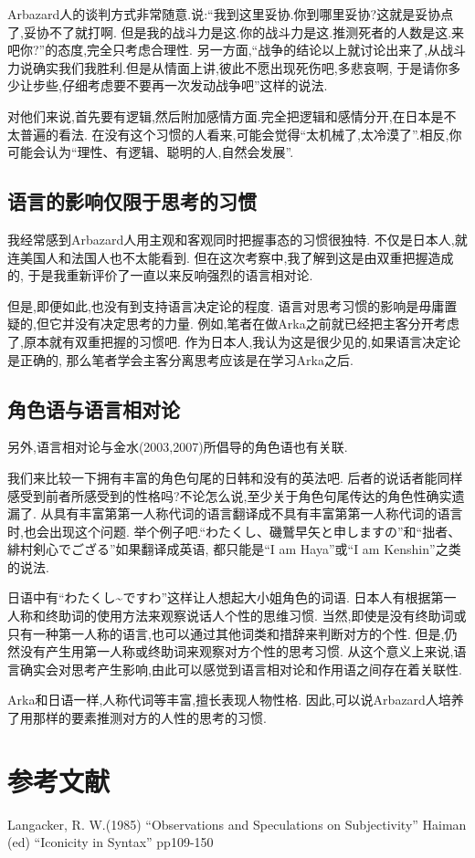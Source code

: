 Arbazard人的谈判方式非常随意.说:“我到这里妥协.你到哪里妥协?这就是妥协点了,妥协不了就打啊.
但是我的战斗力是这.你的战斗力是这.推测死者的人数是这.来吧你?”的态度,完全只考虑合理性.
另一方面,“战争的结论以上就讨论出来了,从战斗力说确实我们我胜利.但是从情面上讲,彼此不愿出现死伤吧,多悲哀啊,
于是请你多少让步些,仔细考虑要不要再一次发动战争吧”这样的说法.

对他们来说,首先要有逻辑,然后附加感情方面.完全把逻辑和感情分开,在日本是不太普遍的看法.
在没有这个习惯的人看来,可能会觉得“太机械了,太冷漠了”.相反,你可能会认为“理性、有逻辑、聪明的人,自然会发展”.
\subsection{语言的影响仅限于思考的习惯}
我经常感到Arbazard人用主观和客观同时把握事态的习惯很独特.
不仅是日本人,就连美国人和法国人也不太能看到.
但在这次考察中,我了解到这是由双重把握造成的,
于是我重新评价了一直以来反响强烈的语言相对论.

但是,即便如此,也没有到支持语言决定论的程度.
语言对思考习惯的影响是毋庸置疑的,但它并没有决定思考的力量.
例如,笔者在做Arka之前就已经把主客分开考虑了,原本就有双重把握的习惯吧.
作为日本人,我认为这是很少见的,如果语言决定论是正确的,
那么笔者学会主客分离思考应该是在学习Arka之后.

\subsection{角色语与语言相对论}
另外,语言相对论与金水(2003,2007)所倡导的角色语也有关联.

我们来比较一下拥有丰富的角色句尾的日韩和没有的英法吧.
后者的说话者能同样感受到前者所感受到的性格吗?不论怎么说,至少关于角色句尾传达的角色性确实遗漏了.
从具有丰富第第一人称代词的语言翻译成不具有丰富第第一人称代词的语言时,也会出现这个问题.
举个例子吧.“わたくし、磯鷲早矢と申しますの”和“拙者、緋村剣心でござる”如果翻译成英语,
都只能是“I am Haya”或“I am Kenshin”之类的说法.

日语中有“わたくし\~{}ですわ”这样让人想起大小姐角色的词语.
日本人有根据第一人称和终助词的使用方法来观察说话人个性的思维习惯.
当然,即使是没有终助词或只有一种第一人称的语言,也可以通过其他词类和措辞来判断对方的个性.
但是,仍然没有产生用第一人称或终助词来观察对方个性的思考习惯.
从这个意义上来说,语言确实会对思考产生影响,由此可以感觉到语言相对论和作用语之间存在着关联性.

Arka和日语一样,人称代词等丰富,擅长表现人物性格.
因此,可以说Arbazard人培养了用那样的要素推测对方的人性的思考的习惯.
\section{参考文献}
Langacker, R. W.(1985) ``Observations and Speculations on Subjectivity'' 
Haiman (ed) ``Iconicity in Syntax'' pp109-150


